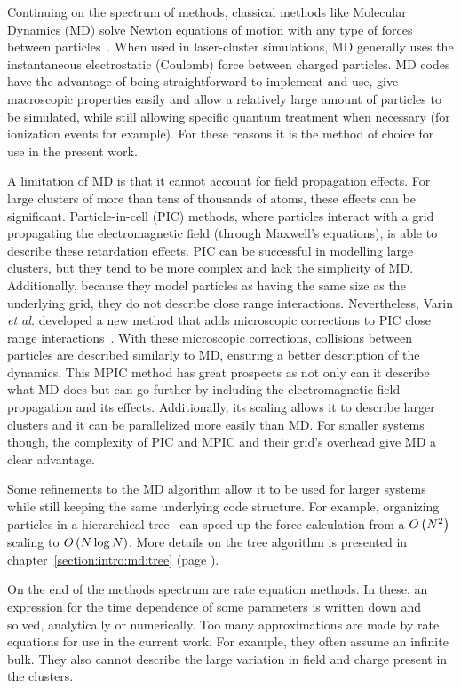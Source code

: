 Continuing on the spectrum of methods, classical methods like Molecular
Dynamics (MD) solve Newton
equations of motion with any type of forces between particles~\cite{Skeel1998}.
When used in
laser-cluster simulations, MD generally uses the instantaneous electrostatic
(Coulomb) force between charged particles. MD codes have the advantage of being
straightforward to implement and use, give macroscopic properties easily and allow a
relatively large amount of particles to be simulated, while still allowing
specific quantum treatment when necessary (for ionization events for example). For
these reasons it is the method of choice for use in the present work.

A limitation of MD is that it cannot account for field propagation effects. For
large clusters of more than tens of thousands of atoms, these effects can be
significant. Particle-in-cell (PIC) methods, where particles interact with a grid propagating the
electromagnetic field (through Maxwell's equations),
is able to describe these retardation effects. PIC can be successful in
modelling large clusters, but they tend to be more complex and lack the
simplicity of MD. Additionally, because they model particles as having the same
size as the underlying grid, they do not describe close range interactions.
Nevertheless, Varin \textit{et al.} developed a new method that adds microscopic
corrections to PIC close range interactions~\cite{Varin2012}. With these microscopic
corrections, collisions between particles are described similarly to MD, ensuring
a better description of the dynamics. This MPIC method has great prospects
as not only can it describe what MD does but can go further by including the
electromagnetic field propagation and its effects. Additionally, its scaling
allows it to describe larger clusters and it can be parallelized more easily
than MD. For smaller systems though, the complexity of PIC and MPIC and their
grid's overhead give MD a clear advantage.

Some refinements to the MD algorithm allow it to be used for larger systems
while still keeping the same underlying code structure. For example, organizing
particles in a hierarchical tree~\cite{Barnes1986,Gibbon2002} can speed up the force
calculation from a $O\left( N^2 \right)$ scaling to $O\left( N \log{N} \right)$. More details on the
tree algorithm is presented in chapter~\ref{section:intro:md:tree} (page
\pageref{section:intro:md:tree}).

On the end of the methods spectrum are rate equation methods. In these, an
expression for the time dependence of some parameters is written down and solved,
analytically or numerically. Too many approximations
are made by rate equations for use in the current work. For example, they often
assume an infinite bulk. They also cannot describe the large variation in field
and charge present in the clusters.

